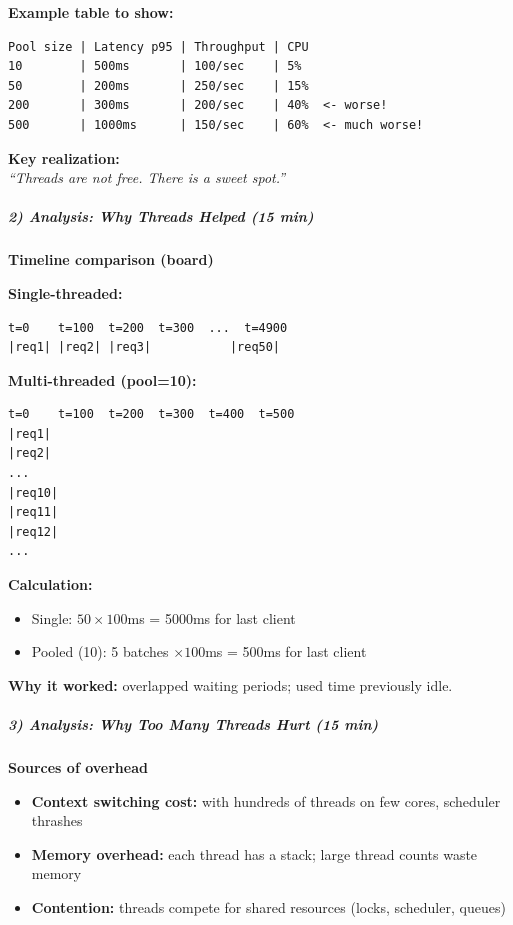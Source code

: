 \documentclass[11pt,a4paper]{article}
\begin{document}
\textbf{Example table to show:}
\begin{verbatim}
Pool size | Latency p95 | Throughput | CPU
10        | 500ms       | 100/sec    | 5%
50        | 200ms       | 250/sec    | 15%
200       | 300ms       | 200/sec    | 40%  <- worse!
500       | 1000ms      | 150/sec    | 60%  <- much worse!
\end{verbatim}

\textbf{Key realization:}\\
\textit{``Threads are not free. There is a sweet spot.''}

\subparagraph{2) Analysis: Why Threads Helped (15 min)}

\textbf{Timeline comparison (board)}

\textbf{Single-threaded:}
\begin{verbatim}
t=0    t=100  t=200  t=300  ...  t=4900
|req1| |req2| |req3|           |req50|
\end{verbatim}

\textbf{Multi-threaded (pool=10):}
\begin{verbatim}
t=0    t=100  t=200  t=300  t=400  t=500
|req1|
|req2|
...
|req10|
|req11|
|req12|
...
\end{verbatim}

\textbf{Calculation:}
\begin{itemize}[leftmargin=*]
\item Single: $50 \times 100$ms = 5000ms for last client
\item Pooled (10): 5 batches $\times 100$ms = 500ms for last client
\end{itemize}

\textbf{Why it worked:} overlapped waiting periods; used time previously idle.

\subparagraph{3) Analysis: Why Too Many Threads Hurt (15 min)}

\textbf{Sources of overhead}
\begin{itemize}[leftmargin=*]
\item \textbf{Context switching cost:} with hundreds of threads on few cores, scheduler thrashes
\item \textbf{Memory overhead:} each thread has a stack; large thread counts waste memory
\item \textbf{Contention:} threads compete for shared resources (locks, scheduler, queues)
\end{itemize}
\end{document}
